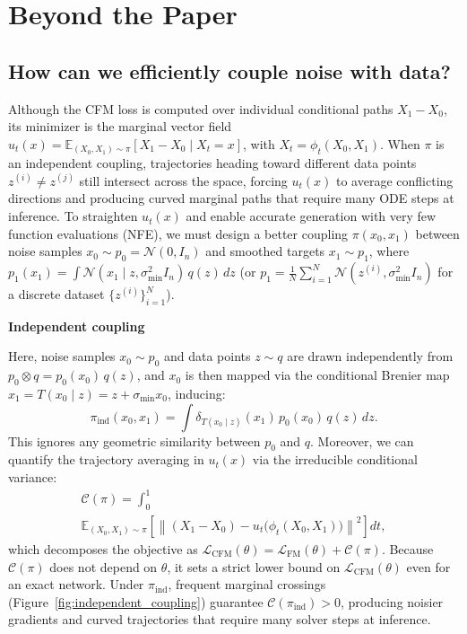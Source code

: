 \section{Beyond the Paper}
\label{sec:beyond}

\subsection{How can we efficiently couple noise with data?}
\label{sec:preprocessing}

Although the CFM loss is computed over individual conditional paths $X_1 - X_0$, its minimizer is the marginal vector field $u_t(x) = \mathbb{E}_{(X_0, X_1)\sim\pi}[X_1 - X_0 \mid X_t = x]$, with $X_t = \phi_t(X_0, X_1)$. When $\pi$ is an independent coupling, trajectories heading toward different data points $z^{(i)} \neq z^{(j)}$ still intersect across the space, forcing $u_t(x)$ to average conflicting directions and producing curved marginal paths that require many ODE steps at inference. To straighten $u_t(x)$ and enable accurate generation with very few function evaluations (NFE), we must design a better coupling $\pi(x_0, x_1)$ between noise samples $x_0 \sim p_0 = \mathcal{N}(0, I_n)$ and smoothed targets $x_1 \sim p_1$, where $p_1(x_1) = \int \mathcal{N}(x_1 \mid z, \sigma_{\min}^2 I_n)\,q(z)\,dz$ (or $p_1 = \frac{1}{N}\sum_{i=1}^N \mathcal{N}(z^{(i)}, \sigma_{\min}^2 I_n)$ for a discrete dataset $\{z^{(i)}\}_{i=1}^N$).

\textbf{Independent coupling}

Here, noise samples $x_0 \sim p_0$ and data points $z \sim q$ are drawn independently from $p_0 \otimes q = p_0(x_0)\,q(z)$, and $x_0$ is then mapped via the conditional Brenier map $x_1 = T(x_0 \mid z) = z + \sigma_{\min} x_0$, inducing:
\begin{equation}
    \pi_{\text{ind}}(x_0, x_1) = \int \delta_{T(x_0 \mid z)}(x_1)\, p_0(x_0)\, q(z)\, dz.
\end{equation}
This ignores any geometric similarity between $p_0$ and $q$. Moreover, we can quantify the trajectory averaging in $u_t(x)$ via the irreducible conditional variance:
\begin{multline}
    \mathcal{C}(\pi) = \int_0^1 \\
    \mathbb{E}_{(X_0, X_1) \sim \pi} \left[ \left\| (X_1 - X_0) - u_t\big(\phi_t(X_0, X_1)\big) \right\|^2 \right] dt,
\end{multline}
which decomposes the objective as $\mathcal{L}_{\text{CFM}}(\theta) = \mathcal{L}_{\text{FM}}(\theta) + \mathcal{C}(\pi)$. Because $\mathcal{C}(\pi)$ does not depend on $\theta$, it sets a strict lower bound on $\mathcal{L}_{\text{CFM}}(\theta)$ even for an exact network. Under $\pi_{\text{ind}}$, frequent marginal crossings (Figure~\ref{fig:independent_coupling}) guarantee $\mathcal{C}(\pi_{\text{ind}}) > 0$, producing noisier gradients and curved trajectories that require many solver steps at inference.

